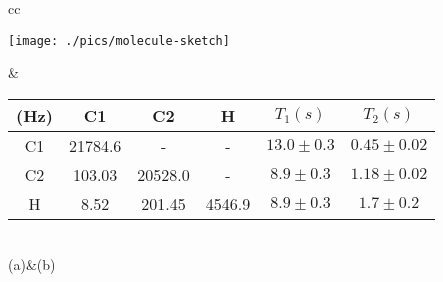 \documentclass[aps,prx,10pt,
               superscriptaddress,
               twocolumn,
               longbibliography,
showpacs]{revtex4-1}
\theoremstyle{plain}
\theoremstyle{definition}
\begin{document}
\begin{figure*}
  \begin{tabular}{cc}
    \begin{minipage}{0.25\textwidth}
      \texttt{[image: ./pics/molecule-sketch]}
    \end{minipage}&
    \begin{minipage}{0.6\textwidth}
      \setlength{\tabcolsep}{5pt}
      \begin{tabular}{cccccc}
        \toprule
           (Hz)  & C1      & C2      & H      & $T_1(s)$     & $T_2(s)$\\
        \midrule
        C1       & 21784.6 & -       & -      & $13.0\pm0.3$ & $0.45\pm0.02$\\
        C2       & 103.03  & 20528.0 & -      & $8.9\pm0.3$  & $1.18\pm0.02$\\
        H        & 8.52    & 201.45  & 4546.9 & $8.9\pm0.3$  & $1.7\pm0.2$\\
        \bottomrule
      \end{tabular}
    \end{minipage}\\
    (a)&(b)
  \end{tabular}
\caption{
  \textbf{(a)} Experimental implementation of time-asymmetry controlled transport
in NMR using trichloroethylene in which the two $^{13}$C and one $^{1}$H spins
form a 3-qubit register.
  \textbf{(b)} Hamiltonian parameters for the system.
The diagonal elements are the chemical shifts~$\nu_i$, and the off-diagonal
elements are scalar coupling
strengths~$J_{ij}$.  $T_1$ and $T_2$ respectively are the relaxation and
dephasing time
scales.
\label{fig:molecule}
}
\end{figure*}



\end{document}
